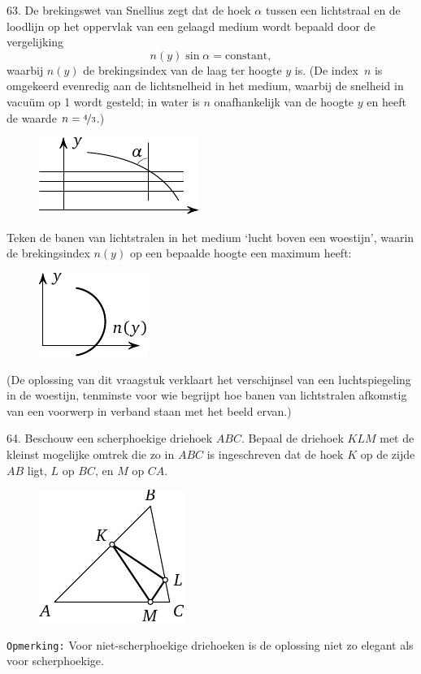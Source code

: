 \begin{problem}{63.}
	De brekingswet van Snellius zegt dat de hoek $\alpha$ tussen een lichtstraal en de loodlijn op het oppervlak van een gelaagd medium wordt bepaald door de vergelijking
	\begin{equation*}
		n(y) \sin \alpha = \text{constant},
	\end{equation*}
	waarbij $n(y)$ de brekingsindex van de laag ter hoogte $y$ is. (De index~$n$ is omgekeerd evenredig aan de lichtsnelheid in het medium, waarbij de snelheid in vacuüm op 1 wordt gesteld; in water is $n$ onafhankelijk van de hoogte $y$ en heeft de waarde $n = \nicefrac{4}{3}$.)
	\begin{figure}
		\null\hfill
		\includegraphics{resources/taskbook-47}
		\hfill\null
	\end{figure}

	Teken de banen van lichtstralen in het medium `lucht boven een woestijn', waarin de brekingsindex $n(y)$ op een bepaalde hoogte een maximum heeft:
	\begin{figure}
		\null\hfill
		\includegraphics{resources/taskbook-471}
		\hfill\null
	\end{figure}

	(De oplossing van dit vraagstuk verklaart het verschijnsel van een luchtspiegeling in de woestijn, tenminste voor wie begrijpt hoe banen van lichtstralen afkomstig van een voorwerp in verband staan met het beeld ervan.)
\end{problem}

\clearpage

\begin{problem}{64.}
	Beschouw een scherphoekige driehoek $ABC$. Bepaal de driehoek $KLM$ met de kleinst mogelijke omtrek die zo in $ABC$ is ingeschreven dat de hoek $K$ op de zijde $AB$ ligt, $L$ op $BC$, en $M$ op $CA$.
	\begin{figure}
		\includegraphics{resources/taskbook-48}
	\end{figure}
\noindent \texttt{Opmerking:} Voor niet-scherphoekige driehoeken is de oplossing niet zo elegant als voor scherphoekige.
\end{problem}


